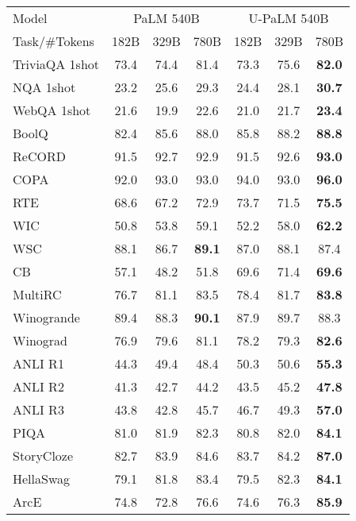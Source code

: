 \documentclass{article}
\newcommand{\modelname}{U-PaLM\xspace}
\begin{document}
\begin{table}[H]
    \centering
    \begin{tabular}{l|ccc|ccc}
    \toprule
    Model & \multicolumn{3}{c}{PaLM 540B}  & \multicolumn{3}{c}{\modelname 540B}\\ 
        Task/\#Tokens & 182B  & 329B & 780B  & 182B & 329B & 780B   \\
        \midrule
         TriviaQA 1shot & 73.4 & 74.4 & 81.4 & 73.3 & 75.6 & \textbf{82.0} \\
         NQA 1shot & 23.2 & 25.6 & 29.3 & 24.4 & 28.1 & \textbf{30.7}\\
         WebQA 1shot & 21.6 & 19.9 & 22.6 & 21.0 & 21.7 & \textbf{23.4}\\ 
         BoolQ & 82.4	&  85.6 & 88.0 & 85.8 & 88.2 & \textbf{88.8}\\
         ReCORD & 91.5 &  92.7 & 92.9 & 91.5 & 92.6 & \textbf{93.0}\\
         COPA & 92.0 &  93.0 & 93.0 & 94.0 & 93.0 & \textbf{96.0}\\
         RTE & 68.6 & 67.2 & 72.9 & 73.7 & 71.5 & \textbf{75.5}\\
         WIC & 50.8 & 53.8 & 59.1 & 52.2 & 58.0 & \textbf{62.2}\\
         WSC & 88.1 & 86.7 &\textbf{89.1} & 87.0 & 88.1 & 87.4\\
         CB &	57.1 & 48.2 & 51.8 & 69.6 & 71.4 & \textbf{69.6}\\
         MultiRC & 	76.7 & 81.1 & 83.5 & 78.4 & 81.7 & \textbf{83.8}\\
         Winogrande & 89.4 & 88.3 & \textbf{90.1} & 87.9 & 89.7 & 88.3\\
         Winograd & 76.9 & 79.6 & 81.1 & 78.2 &  79.3 & \textbf{82.6}\\
         ANLI R1 & 44.3 &49.4 & 48.4 & 50.3 & 50.6 & \textbf{55.3}
         \\
         ANLI R2 & 41.3 & 42.7 & 44.2 & 43.5 & 45.2 & \textbf{47.8}\\
         ANLI R3 & 43.8 & 42.8 & 45.7 & 46.7 & 49.3 & \textbf{57.0}\\ 
         PIQA & 81.0 & 81.9 & 82.3 & 80.8  & 82.0 & \textbf{84.1}\\
         StoryCloze & 82.7  & 83.9 & 84.6 & 83.7 & 84.2 & \textbf{87.0}\\
         HellaSwag & 79.1 & 81.8 & 83.4 & 79.5 & 82.3 & \textbf{84.1}\\ 
         ArcE & 74.8 & 72.8 & 76.6 & 74.6 & 76.3 & \textbf{85.9}\\

\end{tabular}
\end{table}
\end{document}
